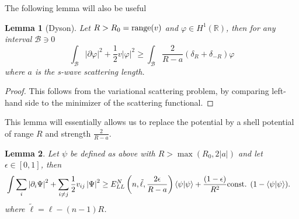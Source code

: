 \documentclass[a4paper,11pt]{article}
\newcommand{\abs}[1]{\left\lvert #1 \right\rvert}
\renewcommand{\braket}[1]{\left\langle#1\right\rangle}
\newcommand{\R}{\mathbb{R}}
\newtheorem{lemma}{Lemma}
\numberwithin{equation}{section}
\begin{document}
	
	
	The following lemma will also be useful \begin{lemma}[Dyson]\label{LemmaDyson} Let $ R>R_0=\textnormal{range}(v) $ and $ \varphi\in H^1(\R) $, then for any interval $ \mathcal{B}\ni 0 $ 
		\begin{equation}
		\int_{\mathcal{B}} \abs{\partial \varphi}^2+\frac12 v\abs{\varphi}^2\geq \int_{\mathcal{B}}\frac{2}{R-a}\left(\delta_R+\delta_{-R}\right)\varphi
		\end{equation}
		where $ a $ is the s-wave scattering length.
	\end{lemma}
	\begin{proof}
		This follows from the variational scattering problem, by comparing left-hand side to the minimizer of the scattering functional.
	\end{proof}
	This lemma will essentially allows us to replace the potential by a shell potential of range $ R $ and strength $ \frac{2}{R-a} $.\\
	\begin{lemma}\label{LemmaNormBoundEpsilon}
		Let $ \psi $ be defined as above with $R>\max\left(R_0,2\abs{a}\right) $ and let $ \epsilon\in[0,1] $, then
		\begin{equation}
		\begin{aligned}
		&\int \sum_{i}\abs{\partial_i\Psi}^2+\sum_{i\neq j} \frac{1}{2}v_{ij}\abs{\Psi}^2\geq E_{LL}^N \left(n,\tilde{\ell},\frac{2\epsilon}{R-a}\right)\braket{\psi|\psi}+ \frac{(1-\epsilon)}{R^2}\textnormal{const. }(1-\braket{\psi|\psi}).
		\end{aligned}
		\end{equation}
		where $ \tilde{\ell}=\ell-(n-1)R $.
	\end{lemma}
\end{document}
